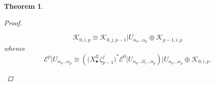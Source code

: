 \documentclass[11pt,fleqn]{article}
\theoremstyle{plain}
\newtheorem{theorem}{Theorem}[subsection]
\theoremstyle{definition}
\theoremstyle{remark}
\numberwithin{equation}{theorem}
\newcommand{\cover}{\mathcal{U}}
\newcommand{\restricted}{\mathbin{\big\vert}}
\newcommand{\nerve}[1]{X_{#1}^\cover}
\begin{document}
\begin{theorem}
\begin{proof}
\begin{enumerate}
                        \begin{equation}
                        \label{equation:cocycle-condition-on-the-K}
                            \mathcal{K}_{0,i,p}
                            \cong
                            \mathcal{K}_{0,j,p-1} \restricted U_{\alpha_0\ldots\alpha_p}
                            \oplus
                            \mathcal{K}_{p-1,i,p}
                        \end{equation}
                        whence
                        \begin{equation}
                        \label{equation:Ep-decomposed-into-Ep-1-as-E0-pullback}
                            \mathcal{E}^p \restricted U_{\alpha_0\ldots\alpha_p}
                            \cong
                            \left(
                                \big(\nerve{\bullet}\zeta_{p-1}^j\big)^* \mathcal{E}^0 \restricted U_{\alpha_0\ldots\widehat{\alpha_i}\ldots\alpha_p}
                            \right) \restricted U_{\alpha_0\ldots\alpha_p}
                            \oplus
                            \mathcal{K}_{0,i,p}.
                        \end{equation}


\end{enumerate}
\end{proof}
\end{theorem}
\end{document}
